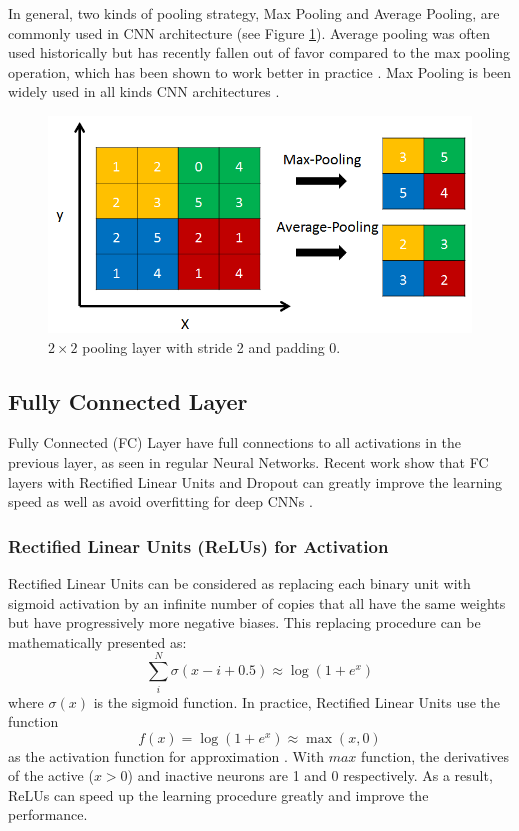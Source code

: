 In general, two kinds of pooling strategy, Max Pooling and Average Pooling, are commonly used in CNN architecture (see Figure \ref{fig:cnn:pool}). Average pooling was often used historically but has recently fallen out of favor compared to the max pooling operation, which has been shown to work better in practice \cite{malmaud2015s} \cite{szegedy2014going}. Max Pooling is been widely used in all kinds CNN architectures \cite{boureau2010theoretical} \cite{yang2009linear}. 
\begin{figure}
	\centering
	\includegraphics[scale=.8]{cnn/fig/pool.png}
	\caption{$2\times2$ pooling layer with stride 2 and padding 0.}\label{fig:cnn:pool}
\end{figure}

\subsection{Fully Connected Layer}
Fully Connected (FC) Layer have full connections to all activations in the previous layer, as seen in regular Neural Networks. Recent work show that FC layers with Rectified Linear Units and Dropout can greatly improve the learning speed as well as avoid overfitting for deep CNNs \cite{hinton2012improving} \cite{nair2010rectified}.
\subsubsection{Rectified Linear Units (ReLUs) for Activation}
Rectified Linear Units can be considered as replacing each binary unit with sigmoid activation by an infinite number of copies that all have the same weights but have progressively more negative biases. This replacing procedure can be mathematically presented as:
\begin{equation}
\sum\limits_i^N {\sigma (x - i + 0.5)}  \approx \log (1 + {e^x})
\end{equation}
where $\sigma(x)$ is the sigmoid function. In practice, Rectified Linear Units use the function 
\begin{equation}
f(x) = \log (1 + {e^x}) \approx \max(x,0) 
\end{equation}\label{eq:cnn:relu}
as the activation function for approximation \cite{jarrett2009best}. With $max$ function, the derivatives of the active ($x>0$) and inactive neurons are 1 and 0 respectively.  As a result, ReLUs can speed up the learning procedure greatly and improve the performance.
